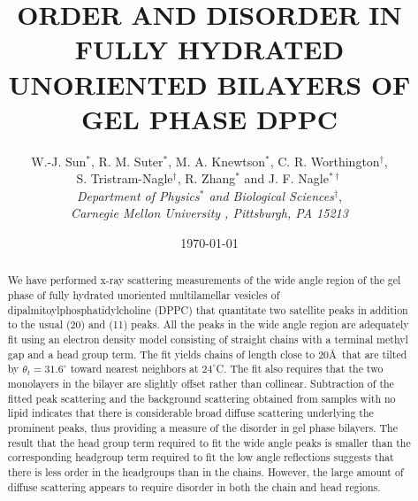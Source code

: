 \def\narrowtext{\par\global\columnwidth20.5pc
\global\hsize\columnwidth\global\linewidth\columnwidth
\global\displaywidth\columnwidth}

\title{{\large {\bf ORDER AND DISORDER IN FULLY HYDRATED \protect\\
UNORIENTED BILAYERS OF GEL PHASE DPPC}}}
\author{W.-J. Sun$^{*}$,  R. M. Suter$^{*}$,  M. A. 
Knewtson$^{*}$, C. R. Worthington$^{\dag}$, \protect\\
S. Tristram-Nagle$^{\dag}$, R. Zhang$^{*}$ and J. F. Nagle$^{* \dag}$ \protect\\
{\it Department of Physics$^{*}$ and Biological Sciences$^{\dag}$},\protect\\
{\it Carnegie Mellon University , Pittsburgh, PA 15213}}
\date{\today}
\maketitle
\begin{abstract}
We have performed x-ray scattering measurements of
the wide angle region of the gel phase of fully hydrated unoriented 
multilamellar vesicles of dipalmitoylphosphatidylcholine (DPPC) that quantitate
two satellite peaks in addition to the usual (20) and (11) peaks.
All the peaks in the wide angle region are adequately fit using an
electron density model consisting of straight chains with a terminal methyl
gap and a head group term.  The fit yields chains of length close to 20\AA \ that
are tilted by ${\theta}_{t}=31.6^{\circ}$ toward nearest neighbors at $24^{\circ}$C.
The fit also requires that the two monolayers in the bilayer are slightly offset 
rather than collinear.  Subtraction of the fitted peak scattering and
the background scattering obtained from samples with no
lipid indicates that there is considerable broad diffuse scattering 
underlying the prominent peaks, thus providing a measure of the disorder
in gel phase bilayers.  The result that the head group term required
to fit the wide angle peaks is smaller 
than the corresponding headgroup term required to fit the low angle
reflections suggests that there is less order in the headgroups than
in the chains.  However, the large amount of diffuse scattering appears
to require disorder in both the chain and head regions.
\end{abstract}

